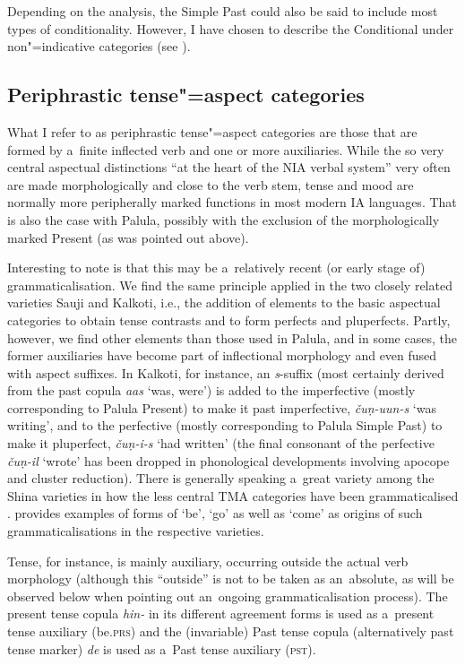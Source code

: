Depending on the analysis, the Simple Past could also be said to include most types of conditionality. However, I have chosen to describe the Conditional under non"=indicative categories (see ).


\subsection{Periphrastic tense"=aspect categories}
\label{subsec:9-1-5}

What I refer to as periphrastic tense"=aspect categories are those that are formed by a~finite inflected verb and one or more auxiliaries. While the so very central aspectual distinctions ``at the heart of the NIA verbal system'' \citep[262]{masica1991} very often are made morphologically and close to the verb stem, tense and mood are normally more peripherally marked functions in most modern IA languages. That is also the case with Palula, possibly with the exclusion of the morphologically marked Present (as was pointed out above). 



Interesting to note is that this may be a~relatively recent (or early stage of) grammaticalisation. We find the same principle applied in the two closely related varieties Sauji and Kalkoti, i.e., the addition of elements to the basic aspectual categories to obtain tense contrasts and to form perfects and pluperfects. Partly, however, we find other elements than those used in Palula, and in some cases, the former auxiliaries have become part of inflectional morphology and even fused with aspect suffixes. In Kalkoti, for instance, an \textit{s}-suffix (most certainly derived from the past copula \textit{aas} `was, were') is added to the imperfective (mostly corresponding to Palula Present) to make it past imperfective, \textit{čuṇ-uun-s} `was writing', and to the perfective (mostly corresponding to Palula Simple Past) to make it pluperfect, \textit{čuṇ-i-s} `had written' (the final consonant of the perfective \textit{čuṇ-il} `wrote' has been dropped in phonological developments involving apocope and cluster reduction). There is generally speaking a~great variety among the Shina varieties in how the less central TMA categories have been grammaticalised \citep[144--156]{liljegren2013}. \citet[38]{schmidt2004} provides examples of forms of `be', `go' as well as `come' as origins of such grammaticalisations in the respective varieties. 



Tense, for instance, is mainly auxiliary, occurring outside the actual verb morphology (although this ``outside'' is not to be taken as an~absolute, as will be observed below when pointing out an~ongoing grammaticalisation process). The present tense copula \textit{hin-} in its different agreement forms is used as a~present tense auxiliary (be.\textsc{prs}) and the (invariable) Past tense copula (alternatively past tense marker) \textit{de} is used as a~Past tense auxiliary (\textsc{pst}).



